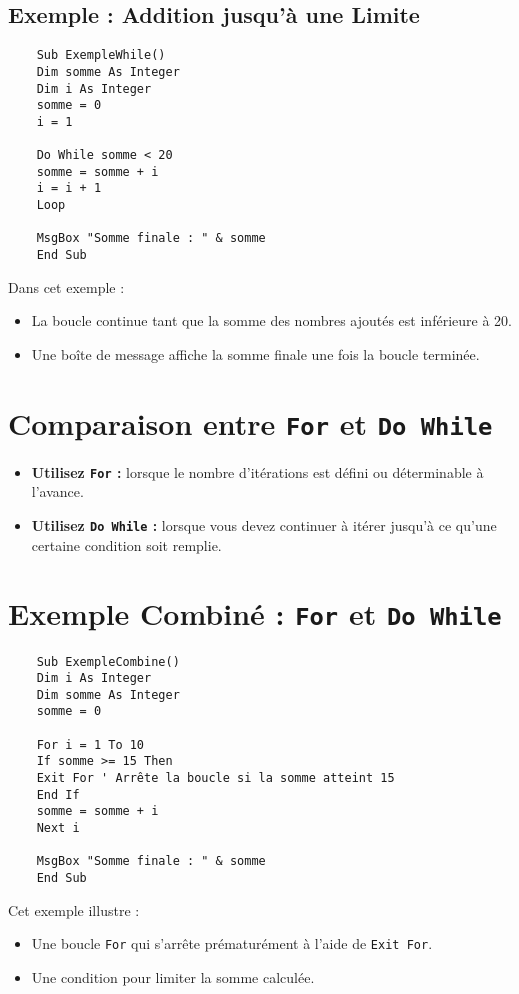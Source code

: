 \documentclass[a4paper,12pt]{report}
\begin{document}
\subsection*{Exemple : Addition jusqu'à une Limite}
\begin{lstlisting}
	Sub ExempleWhile()
	Dim somme As Integer
	Dim i As Integer
	somme = 0
	i = 1
	
	Do While somme < 20
	somme = somme + i
	i = i + 1
	Loop
	
	MsgBox "Somme finale : " & somme
	End Sub
\end{lstlisting}

Dans cet exemple :
\begin{itemize}
	\item La boucle continue tant que la somme des nombres ajoutés est inférieure à 20.
	\item Une boîte de message affiche la somme finale une fois la boucle terminée.
\end{itemize}

\section{Comparaison entre \texttt{For} et \texttt{Do While}}
\begin{itemize}
	\item \textbf{Utilisez \texttt{For} :} lorsque le nombre d'itérations est défini ou déterminable à l'avance.
	\item \textbf{Utilisez \texttt{Do While} :} lorsque vous devez continuer à itérer jusqu'à ce qu'une certaine condition soit remplie.
\end{itemize}
\newpage
\section{Exemple Combiné : \texttt{For} et \texttt{Do While}}
\begin{lstlisting}
	Sub ExempleCombine()
	Dim i As Integer
	Dim somme As Integer
	somme = 0
	
	For i = 1 To 10
	If somme >= 15 Then
	Exit For ' Arrête la boucle si la somme atteint 15
	End If
	somme = somme + i
	Next i
	
	MsgBox "Somme finale : " & somme
	End Sub
\end{lstlisting}

Cet exemple illustre :
\begin{itemize}
	\item Une boucle \texttt{For} qui s'arrête prématurément à l'aide de \texttt{Exit For}.
	\item Une condition pour limiter la somme calculée.
\end{itemize}
\end{document}

